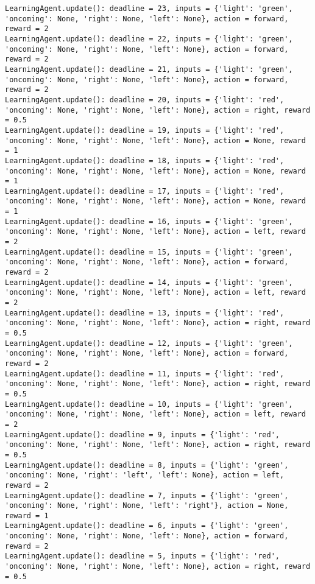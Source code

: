 \documentclass{article}
\begin{document}
\begin{verbatim}
LearningAgent.update(): deadline = 23, inputs = {'light': 'green', 'oncoming': None, 'right': None, 'left': None}, action = forward, reward = 2
LearningAgent.update(): deadline = 22, inputs = {'light': 'green', 'oncoming': None, 'right': None, 'left': None}, action = forward, reward = 2
LearningAgent.update(): deadline = 21, inputs = {'light': 'green', 'oncoming': None, 'right': None, 'left': None}, action = forward, reward = 2
LearningAgent.update(): deadline = 20, inputs = {'light': 'red', 'oncoming': None, 'right': None, 'left': None}, action = right, reward = 0.5
LearningAgent.update(): deadline = 19, inputs = {'light': 'red', 'oncoming': None, 'right': None, 'left': None}, action = None, reward = 1
LearningAgent.update(): deadline = 18, inputs = {'light': 'red', 'oncoming': None, 'right': None, 'left': None}, action = None, reward = 1
LearningAgent.update(): deadline = 17, inputs = {'light': 'red', 'oncoming': None, 'right': None, 'left': None}, action = None, reward = 1
LearningAgent.update(): deadline = 16, inputs = {'light': 'green', 'oncoming': None, 'right': None, 'left': None}, action = left, reward = 2
LearningAgent.update(): deadline = 15, inputs = {'light': 'green', 'oncoming': None, 'right': None, 'left': None}, action = forward, reward = 2
LearningAgent.update(): deadline = 14, inputs = {'light': 'green', 'oncoming': None, 'right': None, 'left': None}, action = left, reward = 2
LearningAgent.update(): deadline = 13, inputs = {'light': 'red', 'oncoming': None, 'right': None, 'left': None}, action = right, reward = 0.5
LearningAgent.update(): deadline = 12, inputs = {'light': 'green', 'oncoming': None, 'right': None, 'left': None}, action = forward, reward = 2
LearningAgent.update(): deadline = 11, inputs = {'light': 'red', 'oncoming': None, 'right': None, 'left': None}, action = right, reward = 0.5
LearningAgent.update(): deadline = 10, inputs = {'light': 'green', 'oncoming': None, 'right': None, 'left': None}, action = left, reward = 2
LearningAgent.update(): deadline = 9, inputs = {'light': 'red', 'oncoming': None, 'right': None, 'left': None}, action = right, reward = 0.5
LearningAgent.update(): deadline = 8, inputs = {'light': 'green', 'oncoming': None, 'right': 'left', 'left': None}, action = left, reward = 2
LearningAgent.update(): deadline = 7, inputs = {'light': 'green', 'oncoming': None, 'right': None, 'left': 'right'}, action = None, reward = 1
LearningAgent.update(): deadline = 6, inputs = {'light': 'green', 'oncoming': None, 'right': None, 'left': None}, action = forward, reward = 2
LearningAgent.update(): deadline = 5, inputs = {'light': 'red', 'oncoming': None, 'right': None, 'left': None}, action = right, reward = 0.5

\end{verbatim}
\end{document}
